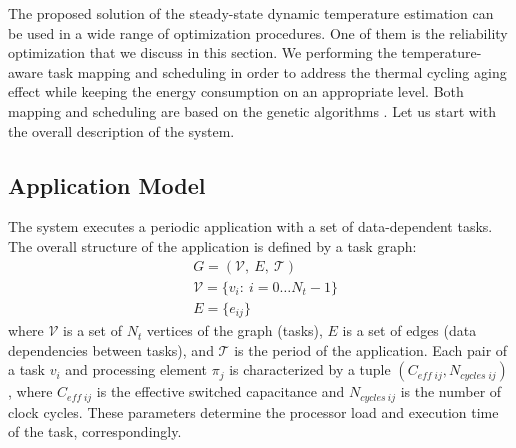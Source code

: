 The proposed solution of the steady-state dynamic temperature estimation can be used in a wide range of optimization procedures. One of them is the reliability optimization that we discuss in this section. We performing the temperature-aware task mapping and scheduling in order to address the thermal cycling aging effect while keeping the energy consumption on an appropriate level. Both mapping and scheduling are based on the genetic algorithms \cite{schmitz2004}. Let us start with the overall description of the system.

\subsection{Application Model}
The system executes a periodic application with a set of data-dependent tasks. The overall structure of the application is defined by a task graph:
\begin{align*}
  & G = (\mathcal{V}, \: E, \: \mathcal{T}) \\
  & \mathcal{V} = \{ v_i: \: i = 0 \dots N_t - 1 \} \\
  & E = \{ e_{ij} \}
\end{align*}
where $\mathcal{V}$ is a set of $N_t$ vertices of the graph (tasks), $E$ is a set of edges (data dependencies between tasks), and $\mathcal{T}$ is the period of the application. Each pair of a task $v_i$ and processing element $\pi_j$ is characterized by a tuple $(C_{eff \; ij}, N_{cycles \; ij})$, where $C_{eff \; ij}$ is the effective switched capacitance and $N_{cycles \: ij}$ is the number of clock cycles. These parameters determine the processor load and execution time of the task, correspondingly.


